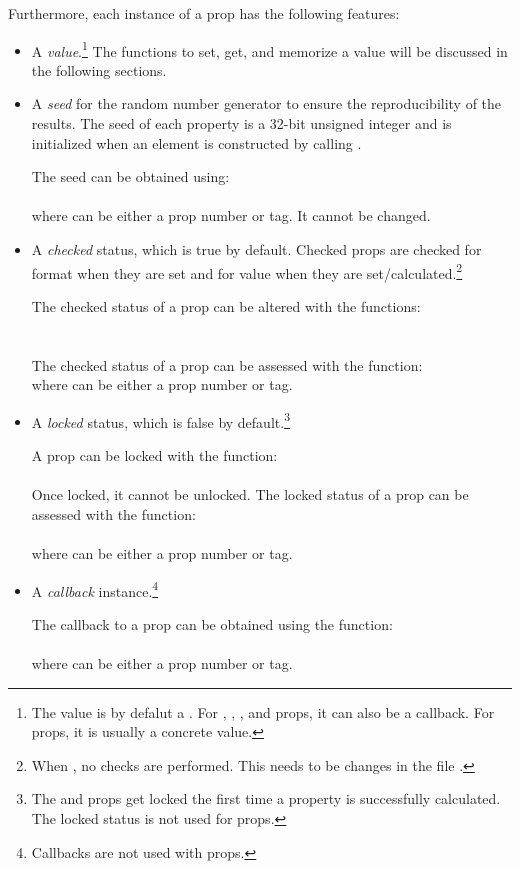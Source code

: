 \documentclass{tufte-handout}
\begin{document}
Furthermore, each instance of a prop has the following features:
\begin{itemize}
	\item A \emph{value}.\footnote{The value is by defalut a . For , , , and  props, it can also be a callback. For  props, it is usually a concrete value.}
	The functions to set, get, and memorize a value will be discussed in the following sections.
	
	\item A \emph{seed} for the random number generator to ensure the reproducibility of the results. 
	The seed of each property is a 32-bit unsigned integer and is initialized when an element is constructed by calling .
	
	The seed can be obtained using:\\
	\\
	where  can be either a prop number or tag.
	It cannot be changed.
 	
	\item A \emph{checked} status, which is true by default.
	Checked props are checked for format when they are set and for value when they are set/calculated.\footnote{When , no checks are performed. This needs to be changes in the file .}
	
	The checked status of a prop can be altered with the functions:\\
	\\
	\\
	The checked status of a prop can be assessed with the function:
	\\
	where  can be either a prop number or tag.
	
	\item A \emph{locked} status, which is false by default.\footnote{The  and  props get locked the first time a  property is successfully calculated. The locked status is not used for  props.}
	
	A prop can be locked with the function:\\
	\\
	Once locked, it cannot be unlocked.
	The locked status of a prop can be assessed with the function:\\
	\\
	where  can be either a prop number or tag.
	
	\item A \emph{callback} instance.\footnote{Callbacks are not used with  props.}
	
	The callback to a prop can be obtained using the function:\\
	\\
	where  can be either a prop number or tag.
	
\end{itemize}
\end{document}
